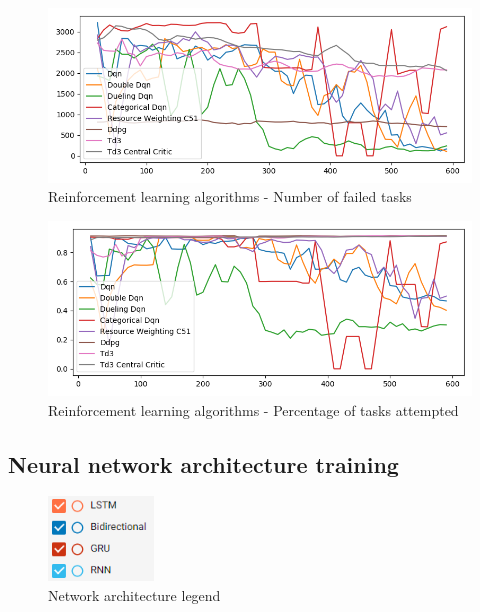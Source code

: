\begin{figure}[H]
    \centering
    \includegraphics[width=\linewidth]{figures/5_evaluation_figs/algo_training_fig/num_failed_tasks.png}
    \caption{Reinforcement learning algorithms - Number of failed tasks}
    \label{fig:algo_num_failed_tasks}
\end{figure}

\begin{figure}[H]
    \centering
    \includegraphics[width=\linewidth]{figures/5_evaluation_figs/algo_training_fig/percent_tasks.png}
    \caption{Reinforcement learning algorithms - Percentage of tasks attempted}
    \label{fig:algo_percent_tasks}
\end{figure}


\subsection{Neural network architecture training}
\label{subsec:neural-network-architecture-training}
\begin{figure}
    \includegraphics[width=0.25\textwidth]{figures/5_evaluation_figs/net_arch_training_fig/legend.png}
    \caption{Network architecture legend}
    \label{fig:net-arch-training-legend}
\end{figure}

